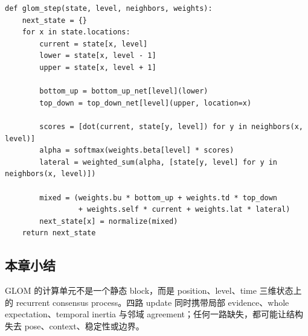 \begin{lstlisting}[caption={GLOM 单次 settling update 的教学伪代码}]
def glom_step(state, level, neighbors, weights):
    next_state = {}
    for x in state.locations:
        current = state[x, level]
        lower = state[x, level - 1]
        upper = state[x, level + 1]

        bottom_up = bottom_up_net[level](lower)
        top_down = top_down_net[level](upper, location=x)

        scores = [dot(current, state[y, level]) for y in neighbors(x, level)]
        alpha = softmax(weights.beta[level] * scores)
        lateral = weighted_sum(alpha, [state[y, level] for y in neighbors(x, level)])

        mixed = (weights.bu * bottom_up + weights.td * top_down
                 + weights.self * current + weights.lat * lateral)
        next_state[x] = normalize(mixed)
    return next_state
\end{lstlisting}

\subsection{本章小结}

GLOM 的计算单元不是一个静态 block，而是 position、level、time 三维状态上的 recurrent consensus process。四路 update 同时携带局部 evidence、whole expectation、temporal inertia 与邻域 agreement；任何一路缺失，都可能让结构失去 pose、context、稳定性或边界。

